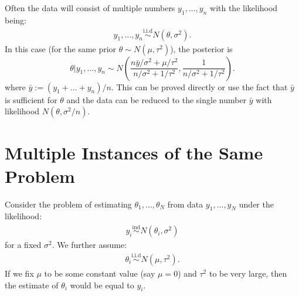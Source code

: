 \documentclass{scrartcl}
\begin{document}
Often the data will consist of multiple numbers $y_1, \dots,
y_n$ with the likelihood being:
\begin{align*}
  y_1, \dots, y_n \overset{\text{i.i.d}}{\sim} N(\theta, \sigma^2). 
\end{align*}
In this case (for the same prior $\theta \sim N(\mu, \tau^2)$), the
posterior is
\begin{equation*}
  \theta | y_1, \dots, y_n \sim N \left(\frac{n\bar{y}/\sigma^2 +
      \mu/\tau^2}{n/\sigma^2 + 1/\tau^2}, \frac{1}{n/\sigma^2 + 1/\tau^2} \right). 
\end{equation*}
where $\bar{y} := (y_1 + \dots + y_n)/n$. This can be proved
directly or use the fact that $\bar{y}$  is sufficient for $\theta$
and the data can be reduced to the single number $\bar{y}$ with
likelihood $N(\theta, \sigma^2/n)$.

\section{Multiple Instances of the Same Problem}

Consider the problem of estimating $\theta_1, \dots, \theta_N$ from
data $y_1, \dots, y_N$ under the likelihood:
\begin{align*}
  y_i \overset{\text{ind}}{\sim} N(\theta_i, \sigma^2)
\end{align*}
for a fixed $\sigma^2$.  We further assume:
\begin{align*}
  \theta_i \overset{\text{i.i.d}}{\sim} N(\mu, \tau^2). 
\end{align*}
If we fix $\mu$ to be some constant value (say $\mu = 0$) and $\tau^2$
to be very large, then the estimate of $\theta_i$ would be equal to
$y_i$.
\end{document}
